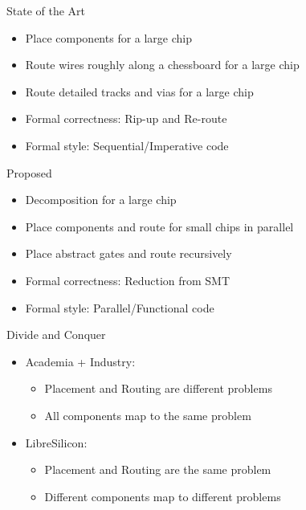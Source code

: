 \documentclass[9pt]{beamer}
\begin{document}
\begin{frame}{State of the Art}
	\begin{itemize}
        \setlength\itemsep{1em}
		\item Place components for a large chip
		\item Route wires roughly along a chessboard for a large chip
		\item Route detailed tracks and vias for a large chip
		\item Formal correctness: Rip-up and Re-route
		\item Formal style: Sequential/Imperative code
	\end{itemize}
\end{frame}

\begin{frame}{Proposed}
	\begin{itemize}
        \setlength\itemsep{1em}
		\item Decomposition for a large chip
		\item Place components and route for small chips in parallel
		\item Place abstract gates and route recursively
		\item Formal correctness: Reduction from SMT
		\item Formal style: Parallel/Functional code
	\end{itemize}
\end{frame}

\begin{frame}{Divide and Conquer}
	\begin{itemize}
        \setlength\itemsep{2em}
            \item Academia + Industry:
	    \begin{itemize}
            \setlength\itemsep{1em}
		\item Placement and Routing are different problems
		\item All components map to the same problem
	    \end{itemize}
            \item LibreSilicon:
	    \begin{itemize}
            \setlength\itemsep{1em}
		\item Placement and Routing are the same problem
		\item Different components map to different problems
	    \end{itemize}
	\end{itemize}
\end{frame}
\end{document}
